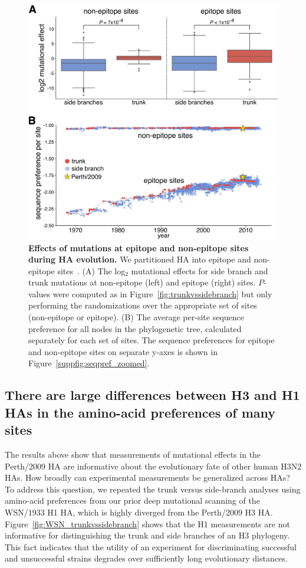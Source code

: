 \documentclass[9pt,twocolumn,twoside]{pnas-new}
\begin{document}
\begin{figure}
\centering
\includegraphics[width=\columnwidth]{figs/sequence_preference/sequence_preference.pdf}
\caption{\label{fig:sequence_preference}
{\bf Effects of mutations at epitope and non-epitope sites during HA evolution.}
We partitioned HA into epitope and non-epitope sites~\cite{wolf2006long}.
(A) The log$_{2}$ mutational effects for side branch and trunk mutations at non-epitope (left) and epitope (right) sites.
$P$-values were computed as in Figure~\ref{fig:trunkvssidebranch} but only performing the randomizations over the appropriate set of sites (non-epitope or epitope).
(B) 
The average per-site sequence preference for all nodes in the phylogenetic tree, calculated separately for each set of sites.
The sequence preferences for epitope and non-epitope sites on separate y-axes is shown in Figure~\ref{suppfig:seqpref_zoomed}.
}
\end{figure}


\subsection*{There are large differences between H3 and H1 HAs in the amino-acid preferences of many sites}
The results above show that measurements of mutational effects in the Perth/2009 HA are informative about the evolutionary fate of other human H3N2 HAs.
How broadly can experimental measurements be generalized across HAs?
To address this question, we repeated the trunk versus side-branch analyses using amino-acid preferences from our prior deep mutational scanning of the WSN/1933 H1 HA, which is highly diverged from the Perth/2009 H3 HA.
Figure~\ref{fig:WSN_trunkvssidebranch} shows that the H1 measurements are not informative for distinguishing the trunk and side branches of an H3 phylogeny.
This fact indicates that the utility of an experiment for discriminating successful and unsuccessful strains degrades over sufficiently long evolutionary distances. 
\end{document}
